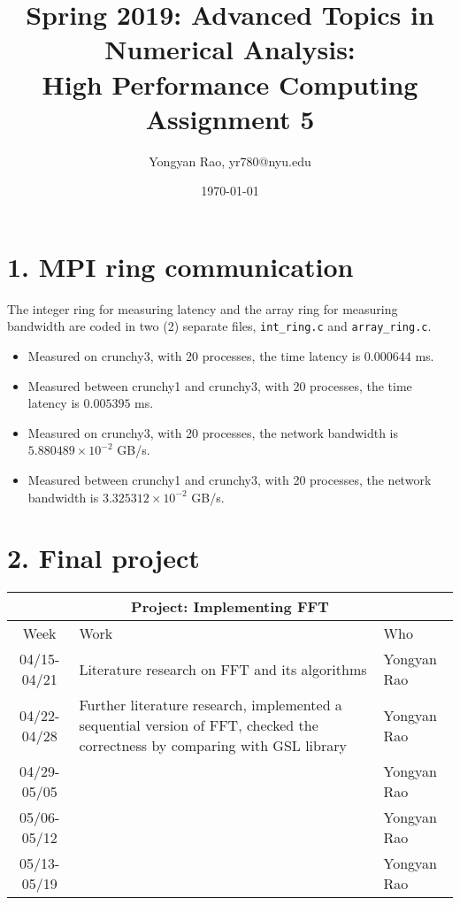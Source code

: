 \documentclass[amsmath,amssymb]{revtex4}
\begin{document}
\title{Spring 2019: Advanced Topics in Numerical Analysis:\\
High Performance Computing\\
Assignment 5}
\author{Yongyan Rao, yr780@nyu.edu}
\date{\today}
\maketitle


\section{\label{sec:sec1}1. MPI ring communication}
The integer ring for measuring latency and the array ring for measuring bandwidth are coded in two (2) separate files, {\tt int\_ring.c} and {\tt array\_ring.c}.
\begin{itemize}
\item Measured on crunchy3, with 20 processes, the time latency is $0.000644$ ms.
\item Measured between crunchy1 and crunchy3, with 20 processes, the time latency is $0.005395$ ms.
\item Measured on crunchy3, with 20 processes, the network bandwidth is $5.880489\times10^{-2}$ GB/s.
\item Measured between crunchy1 and crunchy3, with 20 processes, the network bandwidth is $3.325312\times10^{-2}$ GB/s.
\end{itemize}


\section{\label{sec:sec2}2. Final project}
\begin{center}
  \begin{tabular}{|c|p{10cm}|p{3cm}|}
    \hline
    \multicolumn{3}{|c|}{\bf Project: Implementing FFT} \\
    \hline
    Week & Work & Who  \\ \hline \hline
    04/15-04/21 & Literature research on FFT and its algorithms & Yongyan Rao \\ \hline
    04/22-04/28 & Further literature research, implemented a sequential version of FFT, checked the correctness by comparing with GSL library & Yongyan Rao \\ \hline
    04/29-05/05 &  & Yongyan Rao\\ \hline
    05/06-05/12 &  & Yongyan Rao \\ \hline
    05/13-05/19 &   & Yongyan Rao \\ \hline
  \end{tabular}
  \end{center}
\end{document}
